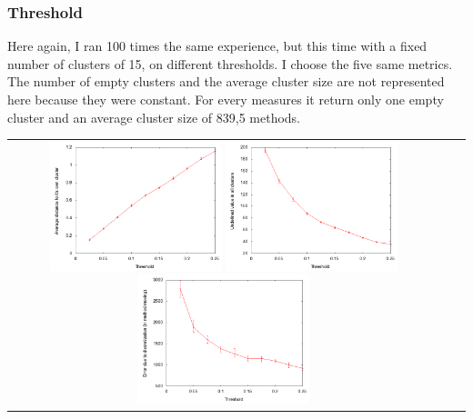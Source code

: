 \documentclass[12pt]{article}
\begin{document}
\subsubsection{Threshold}
\label{threshold}
Here again, I ran 100 times the same experience, but this time with a fixed number of clusters of 15, on different thresholds. I choose the five same metrics. The number of empty clusters and the average cluster size are not represented here because they were constant. For every measures it return only one empty cluster and an average cluster size of 839,5 methods.
\begin{center}
\begin{tabular}{c c c}
\includegraphics[width=5cm]{images/taverageDist.png}
\includegraphics[width=5cm]{images/tquestionMark.png}
\includegraphics[width=5cm]{images/tswitch.png}
\end{tabular}
\end{center}
\end{document}

